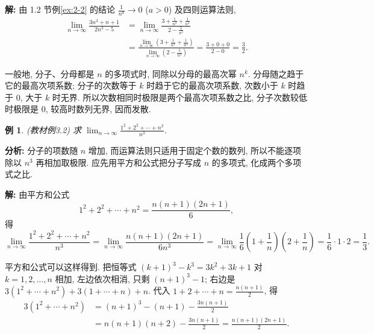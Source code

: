 \documentclass[UTF8,openany]{ctexbook}
\theoremstyle{chinesetextbook}
\newtheorem{example}{例}[section]
\newenvironment{cnsolution}{\par\indent\textbf{解:} \ignorespaces}{\par}
\begin{document}
\begin{cnsolution}
由 1.2 节例\ref{ex:2-2} 的结论 $\displaystyle\frac1{n^a}\to0$ ($a>0$) 及四则运算法则,
\[
\begin{aligned}
\lim_{n\to\infty}\frac{3n^3+n+1}{2n^3-5}
&=\lim_{n\to\infty}\frac{3+\frac1{n^2}+\frac1{n^3}}{2-\frac5{n^3}}\\
&=\frac{\displaystyle\lim_{n\to\infty}\left(3+\frac1{n^2}+\frac1{n^3}\right)}{\displaystyle\lim_{n\to\infty}\left(2-\frac5{n^3}\right)}
=\frac{3+0+0}{2-0}=\frac32.
\end{aligned}
\]
\end{cnsolution}
一般地, 分子、分母都是 $n$ 的多项式时, 同除以分母的最高次幂 $n^k$. 分母随之趋于它的最高次项系数; 分子的次数等于 $k$ 时趋于它的最高次项系数, 次数小于 $k$ 时趋于 $0$, 大于 $k$ 时无界. 所以次数相同时极限是两个最高次项系数之比, 分子次数较低时极限是 $0$, 较高时数列无界, 因而发散.
\begin{example}
\textnormal{(教材例3.2)} 求 $\displaystyle\lim_{n\to\infty}\frac{1^2+2^2+\cdots+n^2}{n^3}$.
\end{example}
\par\indent\textbf{分析:} 分子的项数随 $n$ 增加, 而运算法则只适用于固定个数的数列, 所以不能逐项除以 $n^3$ 再相加取极限. 应先用平方和公式把分子写成 $n$ 的多项式, 化成两个多项式之比.
\begin{cnsolution}
由平方和公式
\[
1^2+2^2+\cdots+n^2=\frac{n(n+1)(2n+1)}6,
\]
得
\[
\lim_{n\to\infty}\frac{1^2+2^2+\cdots+n^2}{n^3}
=\lim_{n\to\infty}\frac{n(n+1)(2n+1)}{6n^3}
=\lim_{n\to\infty}\frac16\left(1+\frac1n\right)\left(2+\frac1n\right)
=\frac16\cdot1\cdot2=\frac13.
\]
\end{cnsolution}
平方和公式可以这样得到. 把恒等式 $(k+1)^3-k^3=3k^2+3k+1$ 对 $k=1,2,\ldots,n$ 相加, 左边依次相消, 只剩 $(n+1)^3-1$; 右边是 $3(1^2+\cdots+n^2)+3(1+\cdots+n)+n$. 代入 $\displaystyle1+2+\cdots+n=\frac{n(n+1)}2$, 得
\[
\begin{aligned}
3(1^2+\cdots+n^2)&=(n+1)^3-(n+1)-\frac{3n(n+1)}2\\
&=n(n+1)(n+2)-\frac{3n(n+1)}2=\frac{n(n+1)(2n+1)}2.
\end{aligned}
\]
\end{document}
